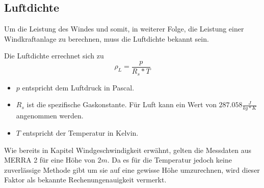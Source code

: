 \documentclass[a4paper,12pt]{article}
\begin{document}
	\subsection{Luftdichte}
	Um die Leistung des Windes und somit, in weiterer Folge, die Leistung einer Windkraftanlage zu berechnen, muss die Luftdichte bekannt sein.\\ \par
	\noindent Die Luftdichte errechnet sich zu
	\begin{equation}
	\rho_L = \frac{p}{R_s * T}
	\end{equation}
	\begin{itemize}
		\item $p$ entspricht dem Luftdruck in Pascal.
		\item $R_s$ ist die spezifische Gaskonstante. Für Luft kann ein Wert von $287.058\frac{J}{kg * K}$ angenommen werden.
		\item $T$ entspricht der Temperatur in Kelvin.	
	\end{itemize}
	Wie bereits in Kapitel Windgeschwindigkeit erwähnt, gelten die Messdaten aus MERRA 2 für eine Höhe von $2m$. Da es für die Temperatur jedoch keine zuverlässige Methode gibt um sie auf eine gewisse Höhe umzurechnen, wird dieser Faktor als bekannte Rechenungenauigkeit vermerkt.
\end{document}
